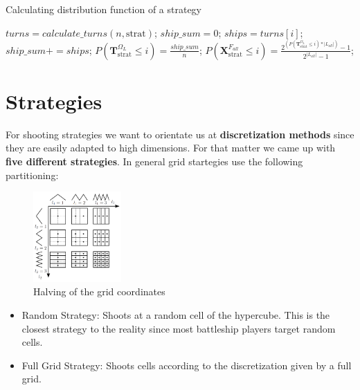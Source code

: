 \documentclass[final,hyperref={pdfpagelabels=false},table]{beamer}
\begin{document}
\begin{frame}
\begin{columns}[T]
\begin{column}{\colCWidth}
\begin{algorithm}[H]
	\caption*{Calculating distribution function of a strategy}\label{alg:evaluateStrat}
	\begin{algorithmic}
		\State $turns = calculate\_turns(n, \text{strat})$;
		\State $ship\_sum=0$;
		\State $ships=turns[i]$;
		\State $ship\_sum += ships$;
		\State $P(\mathbf{T}^{\Omega_L}_{\text{strat}} \leq i)=\frac{ship\_sum}{n}$;
		\State $P(\mathbf{X}^{F_{all}}_{\text{strat}} \leq i)=\frac{2^{\left(P(\mathbf{T}^{\Omega_L}_{\text{strat}} \leq i) * |L_{all}|\right)} - 1}{2^{|L_{all}|} - 1}$;
		\EndFor
		\EndProcedure
	\end{algorithmic}
\end{algorithm}


\section{Strategies}
For shooting strategies we want to orientate us at \textbf{discretization methods} since they are easily adapted to high dimensions. For that matter we came up with \textbf{five different strategies}. In general grid startegies use the following partitioning:
\begin{figure}[h]
	\centering
	\includegraphics[width=0.3\textwidth]{../gfx/Grids03.png}
	\caption{Halving of the grid coordinates}
\end{figure}
\begin{itemize}
\item Random Strategy: Shoots at a random cell of the hypercube. This is the closest strategy to the reality since most battleship players target random cells.
\item Full Grid Strategy: Shoots cells according to the discretization given by a full grid.
\end{itemize}




\end{column}
\end{columns}
\end{frame}
\end{document}
